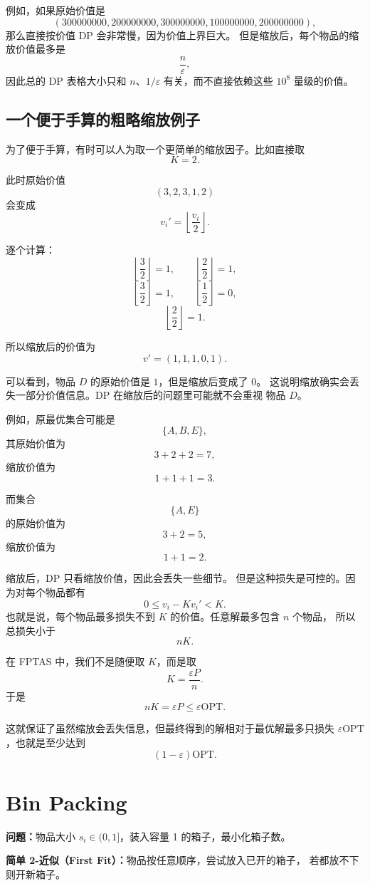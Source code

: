 \documentclass[UTF8,openany,12pt]{ctexbook}
\theoremstyle{remark}
\newcommand{\OPT}{\mathrm{OPT}}
\begin{document}
例如，如果原始价值是
\[
  (300000000,200000000,300000000,100000000,200000000),
\]
那么直接按价值 DP 会非常慢，因为价值上界巨大。
但是缩放后，每个物品的缩放价值最多是
\[
  \frac{n}{\varepsilon},
\]
因此总的 DP 表格大小只和 $n$、$1/\varepsilon$ 有关，而不直接依赖这些
$10^8$ 量级的价值。

\subsection{一个便于手算的粗略缩放例子}

为了便于手算，有时可以人为取一个更简单的缩放因子。比如直接取
\[
  K=2.
\]

此时原始价值
\[
  (3,2,3,1,2)
\]
会变成
\[
  v_i'
  =
  \left\lfloor \frac{v_i}{2}\right\rfloor.
\]

逐个计算：
\[
  \left\lfloor \frac{3}{2}\right\rfloor=1,
  \qquad
  \left\lfloor \frac{2}{2}\right\rfloor=1,
\]
\[
  \left\lfloor \frac{3}{2}\right\rfloor=1,
  \qquad
  \left\lfloor \frac{1}{2}\right\rfloor=0,
\]
\[
  \left\lfloor \frac{2}{2}\right\rfloor=1.
\]

所以缩放后的价值为
\[
  v'=(1,1,1,0,1).
\]

可以看到，物品 $D$ 的原始价值是 $1$，但是缩放后变成了 $0$。
这说明缩放确实会丢失一部分价值信息。DP 在缩放后的问题里可能就不会重视
物品 $D$。

例如，原最优集合可能是
\[
  \{A,B,E\},
\]
其原始价值为
\[
  3+2+2=7,
\]
缩放价值为
\[
  1+1+1=3.
\]

而集合
\[
  \{A,E\}
\]
的原始价值为
\[
  3+2=5,
\]
缩放价值为
\[
  1+1=2.
\]

缩放后，DP 只看缩放价值，因此会丢失一些细节。
但是这种损失是可控的。因为对每个物品都有
\[
  0\le v_i-Kv_i'<K.
\]
也就是说，每个物品最多损失不到 $K$ 的价值。任意解最多包含 $n$ 个物品，
所以总损失小于
\[
  nK.
\]

在 FPTAS 中，我们不是随便取 $K$，而是取
\[
  K=\frac{\varepsilon P}{n}.
\]
于是
\[
  nK=\varepsilon P\le \varepsilon\OPT.
\]

这就保证了虽然缩放会丢失信息，但最终得到的解相对于最优解最多只损失
$\varepsilon\OPT$，也就是至少达到
\[
  (1-\varepsilon)\OPT.
\]

\section{Bin Packing}

\textbf{问题：}物品大小 $s_i \in (0,1]$，装入容量 1 的箱子，最小化箱子数。

\textbf{简单 2-近似（First Fit）：}物品按任意顺序，尝试放入已开的箱子，
若都放不下则开新箱子。
\end{document}
